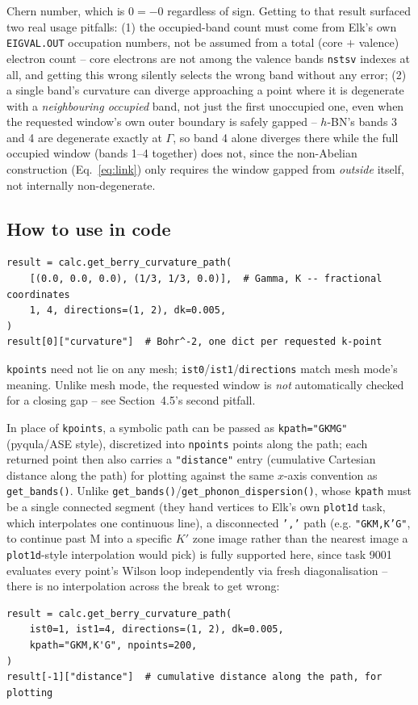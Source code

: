 \documentclass[11pt]{article}
\begin{document}
\begin{itemize}
    Chern number, which is $0=-0$ regardless of sign. Getting to that result surfaced
    two real usage pitfalls: (1) the occupied-band count must come from Elk's own
    \texttt{EIGVAL.OUT} occupation numbers, not be assumed from a total (core $+$
    valence) electron count -- core electrons are not among the valence bands
    \texttt{nstsv} indexes at all, and getting this wrong silently selects the wrong
    band without any error; (2) a single band's curvature can diverge approaching a
    point where it is degenerate with a \emph{neighbouring occupied} band, not just the
    first unoccupied one, even when the requested window's own outer boundary is safely
    gapped -- $h$-BN's bands 3 and 4 are degenerate exactly at $\Gamma$, so band 4 alone
    diverges there while the full occupied window (bands 1--4 together) does not, since
    the non-Abelian construction (Eq.~\eqref{eq:link}) only requires the window gapped
    from \emph{outside} itself, not internally non-degenerate.
\end{itemize}

\subsection{How to use in code}

\begin{verbatim}
result = calc.get_berry_curvature_path(
    [(0.0, 0.0, 0.0), (1/3, 1/3, 0.0)],  # Gamma, K -- fractional coordinates
    1, 4, directions=(1, 2), dk=0.005,
)
result[0]["curvature"]  # Bohr^-2, one dict per requested k-point
\end{verbatim}
\texttt{kpoints} need not lie on any mesh; \texttt{ist0}/\texttt{ist1}/\texttt{directions}
match mesh mode's meaning. Unlike mesh mode, the requested window is \emph{not}
automatically checked for a closing gap -- see Section~4.5's second pitfall.

In place of \texttt{kpoints}, a symbolic path can be passed as
\texttt{kpath="GKMG"} (pyqula/ASE style), discretized into \texttt{npoints} points along
the path; each returned point then also carries a \texttt{"distance"} entry (cumulative
Cartesian distance along the path) for plotting against the same $x$-axis convention as
\texttt{get\_bands()}. Unlike \texttt{get\_bands()}/\texttt{get\_phonon\_dispersion()},
whose \texttt{kpath} must be a single connected segment (they hand vertices to Elk's own
\texttt{plot1d} task, which interpolates one continuous line), a disconnected \texttt{','}
path (e.g. \texttt{"GKM,K'G"}, to continue past M into a specific $K'$ zone image rather
than the nearest image a \texttt{plot1d}-style interpolation would pick) is fully
supported here, since task 9001 evaluates every point's Wilson loop independently via
fresh diagonalisation -- there is no interpolation across the break to get wrong:

\begin{verbatim}
result = calc.get_berry_curvature_path(
    ist0=1, ist1=4, directions=(1, 2), dk=0.005,
    kpath="GKM,K'G", npoints=200,
)
result[-1]["distance"]  # cumulative distance along the path, for plotting
\end{verbatim}
\end{document}
